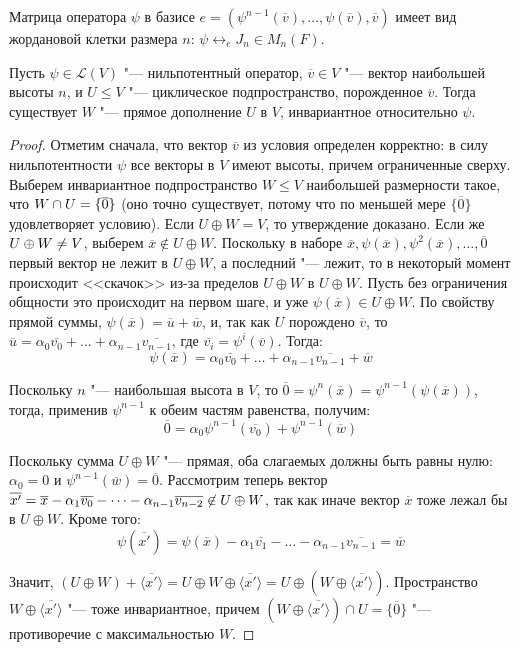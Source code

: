 \begin{note}
	Матрица оператора $\psi$ в базисе $e = (\psi^{n-1}(\overline{v}), \dots, \psi(\overline{v}), \overline{v})$ имеет вид жордановой клетки размера $n$: $\psi \leftrightarrow_e J_n \in M_n(F)$.
\end{note}

\begin{proposition}
	Пусть $\psi \in \mathcal{L}(V)$ "--- нильпотентный оператор, $\overline{v} \in V$ "--- вектор наибольшей высоты $n$, и $U \le V$ "--- циклическое подпространство, порожденное $\overline{v}$. Тогда существует $W$ "--- прямое дополнение $U$ в $V$, инвариантное относительно $\psi$.
\end{proposition}

\begin{proof}
	Отметим сначала, что вектор $\overline{v}$ из условия определен корректно: в силу нильпотентности $\psi$ все векторы в $V$ имеют высоты, причем ограниченные сверху. Выберем инвариантное подпространство $W \le V$ наибольшей размерности такое, что $W \cap U \hm{=} \{\overline{0}\}$ (оно точно существует, потому что по меньшей мере $\{\overline{0}\}$ удовлетворяет условию). Если $U \oplus W = V$, то утверждение доказано. Если же $U \oplus W \hm{\ne} V$, выберем $\overline{x} \not\in U \oplus W$. Поскольку в наборе $\overline{x}, \psi(\overline{x}), \psi^2(\overline{x}), \dots, \overline{0}$ первый вектор не лежит в $U \oplus W$, а последний "--- лежит, то в некоторый момент происходит <<скачок>> из-за пределов $U \oplus W$ в $U \oplus W$. Пусть без ограничения общности это происходит на первом шаге, и уже $\psi(\overline{x}) \in U \oplus W$. По свойству прямой суммы, $\psi(\overline{x}) = \overline{u} + \overline{w}$, и, так как $U$ порождено $\overline{v}$, то $\overline{u} = \alpha_0\overline{v_0} + \dots + \alpha_{n - 1}\overline{v_{n - 1}}$, где $\overline{v_i} = \psi^{i}(\overline{v})$. Тогда:
	\[\psi(\overline{x}) = \alpha_0\overline{v_0} + \dots + \alpha_{n - 1}\overline{v_{n - 1}} + \overline{w}\]
	
	Поскольку $n$ "--- наибольшая высота в $V$, то $\overline{0} = \psi^n(\overline{x}) = \psi^{n-1}(\psi(\overline{x}))$, тогда, применив $\psi^{n - 1}$ к обеим частям равенства, получим:
	\[\overline{0} = \alpha_0\psi^{n - 1}(\overline{v_0}) + \psi^{n - 1}(\overline{w})\]
	
	Поскольку сумма $U \oplus W$ "--- прямая, оба слагаемых должны быть равны нулю: $\alpha_0 = 0$ и $\psi^{n - 1}(\overline{w}) = \overline{0}$. Рассмотрим теперь вектор $\overline{x'} \hm{=} \overline{x} - \alpha_1\overline{v_0} - \dots - \alpha_{n-1}\overline{v_{n-2}} \not\in U \oplus W$, так как иначе вектор $\overline{x}$ тоже лежал бы в $U \oplus W$. Кроме того:
	\[\psi(\overline{x'}) = \psi(\overline{x}) - \alpha_1\overline{v_1} - \dots - \alpha_{n-1}\overline{v_{n-1}} = \overline{w}\]
	
	Значит, $(U \oplus W) + \langle\overline{x'}\rangle = U \oplus W \oplus \langle\overline{x'}\rangle = U \oplus (W \oplus \langle\overline{x'}\rangle)$. Пространство $W \oplus \langle\overline{x'}\rangle$ "--- тоже инвариантное, причем $(W \oplus \langle\overline{x'}\rangle) \cap U = \{\overline{0}\}$ "--- противоречие с максимальностью $W$.
\end{proof}

